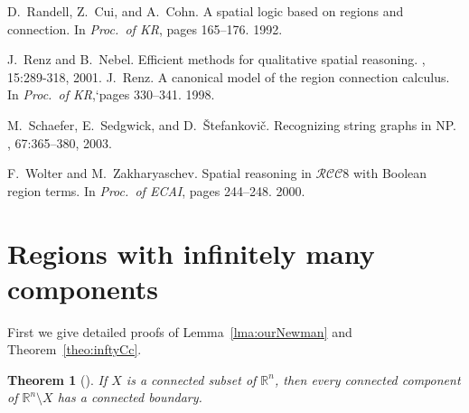 \documentclass{article}
\newtheorem{theorem}{Theorem}
\newcommand{\RCCE}{\ensuremath{\mathcal{RCC}8}}\newcommand{\RCCF}{\ensuremath{\mathcal{RCC}5}}\newcommand{\BRCCE}{\ensuremath{\mathcal{BRCC}8}}\newcommand{\RCCEc}{\ensuremath{\RCCE{}c}}\newcommand{\RCCEci}{\ensuremath{\RCCE{}c^\circ}}\newcommand{\cBCc}{\ensuremath{\mathcal{C}c}}\newcommand{\cBCci}{\ensuremath{\mathcal{C}c^\circ}}
\newcommand{\R}{\mathbb{R}}
\begin{document}
\begin{thebibliography}{}
D.~Randell, Z.~Cui, and A.~Cohn.
\newblock A spatial logic based on regions and connection.
\newblock In {\em Proc.\ of
  KR}, pages 165--176. 1992.

J.~Renz and B.~Nebel.
\newblock Efficient methods for qualitative spatial reasoning.
, 15:289-318, 2001. 
J.~Renz.
\newblock A canonical model of the region connection calculus.
\newblock In {\em Proc.\ of
  KR},`pages 330--341. 1998.

M.~Schaefer, E.~Sedgwick, and D.~{\v{S}}tefankovi{\v{c}}.
\newblock Recognizing string graphs in {NP}.
, 67:365--380, 2003.

F.~Wolter and M.~Zakharyaschev.
\newblock Spatial reasoning in \RCCE{} with {B}oolean region terms.
\newblock In {\em Proc.\ of ECAI}, pages 244--248.  2000.

\end{thebibliography}

\cleardoublepage

\appendix

\section{Regions with infinitely many components}
\label{sec:sensitivityA}
First we give detailed proofs of Lemma~\ref{lma:ourNewman} and
Theorem~\ref{theo:inftyCc}.
\begin{theorem}[\cite{ijcai:Newman64}]\label{thm:NewmanBnd} 
If $X$ is a connected subset of $\R^n$, then every connected component
of $\R^n\setminus X$ has a connected boundary.
\end{theorem}
\end{document}
